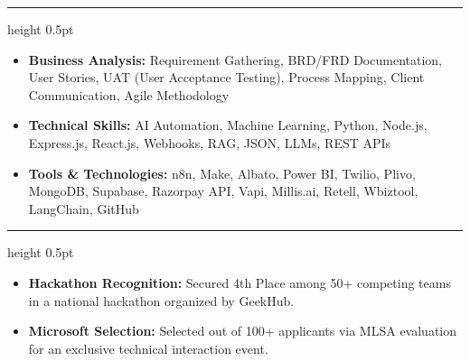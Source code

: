 \documentclass[10pt,a4paper]{article}
\newcommand{\resumesection}[2]{
  \vspace{3pt}
  \noindent{\large\bfseries\sffamily\color{navyblue}{\mbox{#1}}\hspace{6pt}{\sffamily #2}}
  \vspace{1pt}
  \hrule height 0.5pt
  \vspace{2pt}
}
\begin{document}
\resumesection{\faCogs}{Skills}
\begin{itemize}[leftmargin=*, noitemsep, topsep=0pt, parsep=1.5pt, partopsep=0pt, itemsep=0.5pt]
    \item \textbf{Business Analysis:} Requirement Gathering, BRD/FRD Documentation, User Stories, UAT (User Acceptance Testing), Process Mapping, Client Communication, Agile Methodology
    \item \textbf{Technical Skills:} AI Automation, Machine Learning, Python, Node.js, Express.js, React.js, Webhooks, RAG, JSON, LLMs, REST APIs
    \item \textbf{Tools \& Technologies:} n8n, Make, Albato, Power BI, Twilio, Plivo, MongoDB, Supabase, Razorpay API, Vapi, Millis.ai, Retell, Wbiztool, LangChain, GitHub
\end{itemize}

\resumesection{\faTrophy}{Achievements}
\begin{itemize}[leftmargin=*, noitemsep, topsep=0pt, parsep=1.5pt, partopsep=0pt, itemsep=0.5pt]
    \item \textbf{Hackathon Recognition:} Secured 4th Place among 50+ competing teams in a national hackathon organized by GeekHub.
    \item \textbf{Microsoft Selection:} Selected out of 100+ applicants via MLSA evaluation for an exclusive technical interaction event.
\end{itemize}
\end{document}
